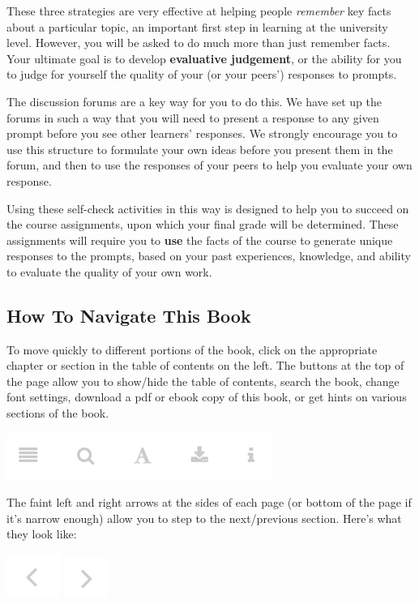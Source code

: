 \documentclass[
]{book}
\begin{document}
These three strategies are very effective at helping people \emph{remember} key facts about a particular topic, an important first step in learning at the university level. However, you will be asked to do much more than just remember facts. Your ultimate goal is to develop \textbf{evaluative judgement}, or the ability for you to judge for yourself the quality of your (or your peers') responses to prompts.

The discussion forums are a key way for you to do this. We have set up the forums in such a way that you will need to present a response to any given prompt before you see other learners' responses. We strongly encourage you to use this structure to formulate your own ideas before you present them in the forum, and then to use the responses of your peers to help you evaluate your own response.

Using these self-check activities in this way is designed to help you to succeed on the course assignments, upon which your final grade will be determined. These assignments will require you to \textbf{use} the facts of the course to generate unique responses to the prompts, based on your past experiences, knowledge, and ability to evaluate the quality of your own work.

\hypertarget{how-to-navigate-this-book}{%
\subsection*{How To Navigate This Book}\label{how-to-navigate-this-book}}

To move quickly to different portions of the book, click on the appropriate chapter or section in the table of contents on the left. The buttons at the top of the page allow you to show/hide the table of contents, search the book, change font settings, download a pdf or ebook copy of this book, or get hints on various sections of the book.

\includegraphics{assets/course-intro/menu.png}

The faint left and right arrows at the sides of each page (or bottom of the page if it's narrow enough) allow you to step to the next/previous section. Here's what they look like:

\includegraphics{assets/course-intro/left_arrow.png} \includegraphics{assets/course-intro/right_arrow.png}
\end{document}
